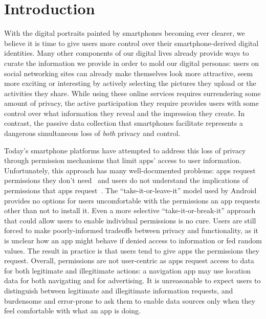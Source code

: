 
\section{Introduction} \label{sec-introduction}

With the digital portraits painted by smartphones becoming ever clearer, we
believe it is time to give users more control over their smartphone-derived
digital identities. Many other components of our digital lives already provide
ways to curate the information we provide in order to mold our digital
personas: users on social networking sites can already make themselves look
more attractive, seem more exciting or interesting by actively selecting
the pictures they upload or the activities they share. While using these
online services requires surrendering some amount of privacy, the active
participation they require provides users with some control over what
information they reveal and the impression they create. In contrast, the
passive data collection that smartphones facilitate represents a dangerous
simultaneous loss of \textit{both} privacy and control.


Today's smartphone platforms have attempted to address this loss of privacy
through permission mechanisms that limit apps' access to user information.
Unfortunately, this approach has many well-documented problems: apps request
permissions they don't need~\cite{taintdroid-osdi,demystified-ccs11} and
users do not understand the implications of permissions that apps
request~\cite{androidperms-soups12}. The ``take-it-or-leave-it'' model used
by Android provides no options for users uncomfortable with the permissions
an app requests other than not to install it. Even a more selective
``take-it-or-break-it'' approach~\cite{apex-asiaccs10} that could allow users
to enable individual permissions is no cure. Users are still forced to make
poorly-informed tradeoffs between privacy and functionality, as it is unclear
how an app might behave if denied access to information or fed random values.
The result in practice is that users tend to give apps the permissions they
request. Overall, permissions are not user-centric as apps request access to
data for both legitimate and illegitimate actions: a navigation app may use
location data for both navigating and for advertising. It is unreasonable to
expect users to distinguish between legitimate and illegitimate information
requests, and burdensome and error-prone to ask them to enable data sources
only when they feel comfortable with what an app is doing.

